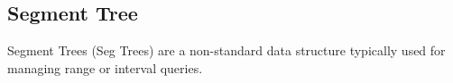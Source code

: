\subsection*{Segment Tree}

Segment Trees (Seg Trees) are a non-standard data structure typically used for managing range or interval queries.
